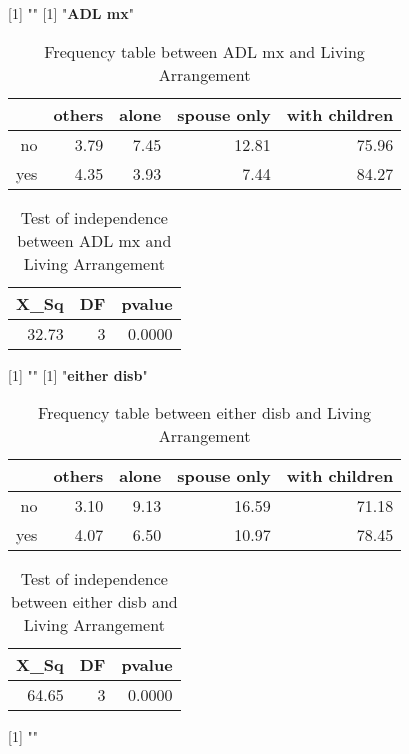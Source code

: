 \documentclass[11pt]{article}
\begin{document}
[1] "\newline"
[1] "{\bf{ADL mx}}"
\begin{table}[H]
\centering
\begin{tabular}{rrrrr}
  \hline
 & others & alone & spouse only & with children \\ 
  \hline
no & 3.79 & 7.45 & 12.81 & 75.96 \\ 
  yes & 4.35 & 3.93 & 7.44 & 84.27 \\ 
   \hline
\end{tabular}
\caption{Frequency table between ADL mx and Living Arrangement} 
\end{table}
\begin{table}[H]
\centering
\begin{tabular}{rrr}
  \hline
X\_Sq & DF & pvalue \\ 
  \hline
32.73 & 3 & 0.0000 \\ 
   \hline
\end{tabular}
\caption{Test of independence between ADL mx and Living Arrangement} 
\end{table}
[1] "\newline"
[1] "{\bf{either disb}}"
\begin{table}[H]
\centering
\begin{tabular}{rrrrr}
  \hline
 & others & alone & spouse only & with children \\ 
  \hline
no & 3.10 & 9.13 & 16.59 & 71.18 \\ 
  yes & 4.07 & 6.50 & 10.97 & 78.45 \\ 
   \hline
\end{tabular}
\caption{Frequency table between either disb and Living Arrangement} 
\end{table}
\begin{table}[H]
\centering
\begin{tabular}{rrr}
  \hline
X\_Sq & DF & pvalue \\ 
  \hline
64.65 & 3 & 0.0000 \\ 
   \hline
\end{tabular}
\caption{Test of independence between either disb and Living Arrangement} 
\end{table}
[1] "\newline"
\end{document}
